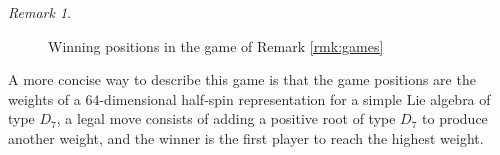 \documentclass{amsart}
\theoremstyle{plain}
\theoremstyle{definition}
\theoremstyle{remark}
\newtheorem{rmk}[theorem]{Remark}
\numberwithin{equation}{section}
\begin{document}
\begin{rmk}
\begin{figure}
\begin{center}
       \caption{Winning positions in the game of Remark \ref{rmk:games}}
\label{fig:kernel}
\end{center}
\end{figure}

A more concise way to describe this game is that the game positions are the weights of a $64$-dimensional half-spin 
representation for a simple Lie algebra of type $D_7$, a legal move consists of adding a positive root of type $D_7$
to produce another weight, and the winner is the first player to reach the highest weight.
\end{rmk}





\end{document}
